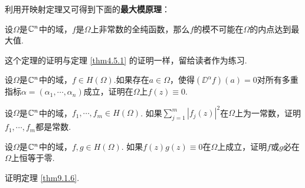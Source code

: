 利用开映射定理又可得到下面的\textbf{最大模原理}：
\begin{theorem}\label{thm9.1.6}
设$\Omega$是$\mathbb C^n$中的域，$f$是$\Omega$上非常数的全纯函数，那么$f$的模不可能在$\Omega$的内点达到最大值.
\end{theorem}

这个定理的证明与定理 \ref{thm4.5.1} 的证明一样，留给读者作为练习.
\begin{xiti}
\item 设$\Omega$是$\mathbb C^n$中的域，$f\in H(\Omega)$.如果存在$a\in\Omega$，使得$(\DD^\alpha f)(a)=0$对所有多重指标$\alpha=(\alpha_1,\cdots,\alpha_n)$成立，证明在$\Omega$上$f(z)\equiv0$.
\item 设$\Omega$是$\mathbb C^n$中的域，$f_1,\cdots,f_m\in H(\Omega)$. 如果$\sum_{j=1}^m|f_j(z)|^2$在$\Omega$上为一常数，证明$f_1,\cdots,f_m$都是常数.
\item 设$\Omega$是$\mathbb C^n$中的域，$f,g\in H(\Omega)$. 如果$f(z)g(z)\equiv0$在$\Omega$上成立，证明$f$或$g$必在$\Omega$上恒等于零.
\item 证明定理 \ref{thm9.1.6}.
\end{xiti}

